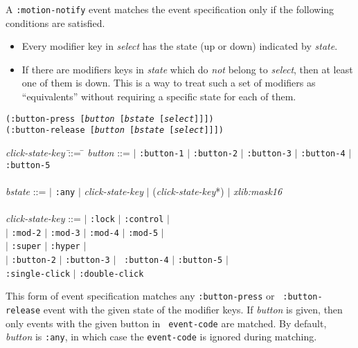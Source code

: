 \documentclass[twoside]{book}
\begin{document}
\begin{sloppy}
\begin{flushright}
\parbox[t]{5.75in}{
A {\tt :motion-notify} event matches the event specification only if the
following conditions are satisfied.
\begin{itemize}
\item Every modifier key in {\em select} has the state (up or down)
indicated by {\em state}. 
\item If there are modifiers keys in {\em state} which do {\em not}
belong to {\em select}, then at least one of
them is down. This is a way to treat such a set of modifiers as
``equivalents'' without requiring a specific state for each of them.
\end{itemize}
}
\end{flushright}

{\samepage
{}
{\tt (:button-press [{\em button} [{\em bstate} [{\em select}]]])}\\
{\tt (:button-release [{\em button} [{\em bstate} [{\em select}]]])}\\
\hspace*{.75in}
\parbox[t]{5.75in}{
\begin{tabbing}
{\em click-state-key} \= ::= \= \kill
{\em button} \>::=  $|$ {\tt :button-1} $|$ {\tt :button-2} $|$
{\tt :button-3} $|$ {\tt :button-4} $|$ {\tt :button-5}\\
\\
{\em bstate} \>::=  $|$ {\tt :any} $|$ {\em click-state-key} $|$
                      ({\em click-state-key}*) $|$ {\em xlib:mask16} \\
\\
{\em click-state-key} \>::=  $|$ {\tt :lock} $|$ {\tt :control} $|$ \\
                \>     $|$ {\tt :mod-2} $|$ {\tt :mod-3} $|$ {\tt :mod-4} $|$ {\tt :mod-5} $|$ \\
                \>     $|$ {\tt :super} $|$ {\tt :hyper} $|$\\
                \>     $|$ {\tt :button-2} $|$ {\tt :button-3} $|$ {\tt
:button-4} $|$ {\tt :button-5} $|$\\
                \>      \> {\tt :single-click} $|$ {\tt :double-click}\\ 

\end{tabbing}}
}
\begin{flushright}
\parbox[t]{5.75in}{
This form of event specification matches any {\tt :button-press} or {\tt
:button-release} event with the given state of the modifier keys. If
{\em button} is given, then only events with the given button in {\tt
event-code} are matched. By default, {\em button} is {\tt :any}, in
which case the {\tt event-code} is ignored during matching. }


\end{flushright}
\end{sloppy}
\end{document}

